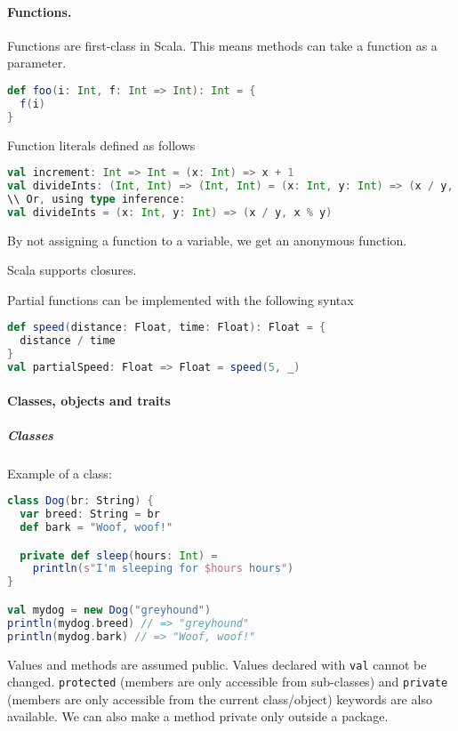 \paragraph{Functions.}
Functions are first-class in Scala. This means methods can take a function as a parameter.
\begin{lstlisting}[language=scala, style=snippet]
def foo(i: Int, f: Int => Int): Int = {
  f(i)
}
\end{lstlisting}
Function literals defined as follows
\begin{lstlisting}[language=scala, style=snippet]
val increment: Int => Int = (x: Int) => x + 1
val divideInts: (Int, Int) => (Int, Int) = (x: Int, y: Int) => (x / y, x % y)
\\ Or, using type inference:
val divideInts = (x: Int, y: Int) => (x / y, x % y)
\end{lstlisting}
By not assigning a function to a variable, we get an anonymous function.

Scala supports closures.

Partial functions can be implemented with the following syntax
\begin{lstlisting}[language=scala, style=snippet]
def speed(distance: Float, time: Float): Float = {
  distance / time
}
val partialSpeed: Float => Float = speed(5, _)
\end{lstlisting}

\paragraph{Classes, objects and traits}
\subparagraph{Classes} Example of a class:
\begin{lstlisting}[language=scala, style=snippet]
class Dog(br: String) {
  var breed: String = br
  def bark = "Woof, woof!"

  private def sleep(hours: Int) =
    println(s"I'm sleeping for $hours hours")
}

val mydog = new Dog("greyhound")
println(mydog.breed) // => "greyhound"
println(mydog.bark) // => "Woof, woof!"
\end{lstlisting}
Values and methods are assumed public. Values declared with \texttt{val} cannot be changed. \texttt{protected} (members are only accessible from sub-classes) and \texttt{private} (members are only accessible from the current class/object) keywords are also available. We can also make a method private only outside a package.

